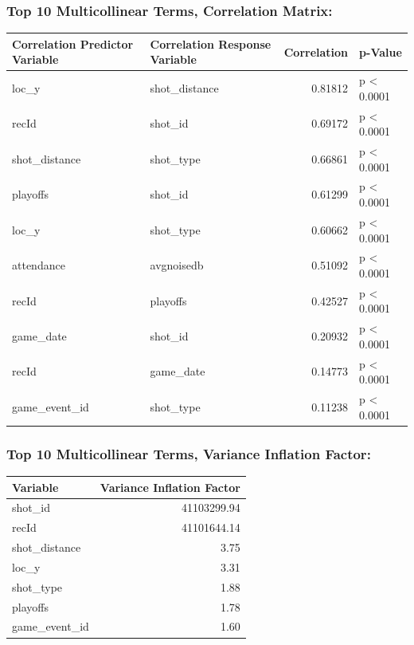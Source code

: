 \documentclass[american,]{article}
\begin{document}
\hypertarget{top-10-multicollinear-terms-correlation-matrix}{%
\subsubsection{\texorpdfstring{\textbf{Top 10 Multicollinear Terms, Correlation Matrix:}}{Top 10 Multicollinear Terms, Correlation Matrix:}}\label{top-10-multicollinear-terms-correlation-matrix}}

\begin{table}[H]
\centering
\begin{tabular}{llrl}
\toprule
Correlation Predictor Variable & Correlation Response Variable & Correlation & p-Value\\
\midrule
\rowcolor{gray!6}  loc\_y & shot\_distance & 0.81812 & p < 0.0001\\
recId & shot\_id & 0.69172 & p < 0.0001\\
\rowcolor{gray!6}  shot\_distance & shot\_type & 0.66861 & p < 0.0001\\
playoffs & shot\_id & 0.61299 & p < 0.0001\\
\rowcolor{gray!6}  loc\_y & shot\_type & 0.60662 & p < 0.0001\\
\addlinespace
attendance & avgnoisedb & 0.51092 & p < 0.0001\\
\rowcolor{gray!6}  recId & playoffs & 0.42527 & p < 0.0001\\
game\_date & shot\_id & 0.20932 & p < 0.0001\\
\rowcolor{gray!6}  recId & game\_date & 0.14773 & p < 0.0001\\
game\_event\_id & shot\_type & 0.11238 & p < 0.0001\\
\bottomrule
\end{tabular}
\end{table}

\hypertarget{top-10-multicollinear-terms-variance-inflation-factor}{%
\subsubsection{\texorpdfstring{\textbf{Top 10 Multicollinear Terms, Variance Inflation Factor:}}{Top 10 Multicollinear Terms, Variance Inflation Factor:}}\label{top-10-multicollinear-terms-variance-inflation-factor}}

\begin{table}[H]
\centering
\begin{tabular}{lr}
\toprule
Variable & Variance Inflation Factor\\
\midrule
\rowcolor{gray!6}  shot\_id & 41103299.94\\
recId & 41101644.14\\
\rowcolor{gray!6}  shot\_distance & 3.75\\
loc\_y & 3.31\\
\rowcolor{gray!6}  shot\_type & 1.88\\
\addlinespace
playoffs & 1.78\\
\rowcolor{gray!6}  game\_event\_id & 1.60\\
\bottomrule
\end{tabular}
\end{table}
\end{document}
